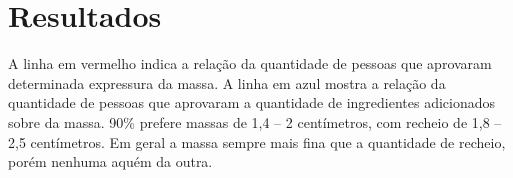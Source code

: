 \section{Resultados}

\noindent A linha em vermelho indica a relação da quantidade de pessoas que 
aprovaram determinada expressura da massa.  A linha em azul mostra a relação da 
quantidade de pessoas que aprovaram a quantidade de ingredientes adicionados 
sobre da massa.  90\% prefere massas de 1,4 -- 2 centímetros, com recheio de 
1,8 -- 2,5 centímetros.  Em geral
a massa sempre mais fina que a quantidade de recheio, porém nenhuma aquém
da outra.



